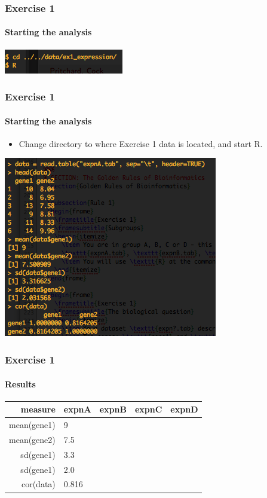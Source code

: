 \documentclass[table]{beamer}
\begin{document}
  \begin{frame}
    \frametitle{Exercise 1}
    \framesubtitle{Starting the analysis}
    \includegraphics[width=.5\textwidth]{images/ex1_screenshot_a}
  \end{frame}

  \begin{frame}
    \frametitle{Exercise 1}
    \framesubtitle{Starting the analysis}
    \begin{itemize}
      \item Change directory to where Exercise 1 data is located, and start R.
    \end{itemize}
    \includegraphics[width=.5\textwidth]{images/ex1_screenshot_b}
  \end{frame}

  \begin{frame}
    \frametitle{Exercise 1}
    \framesubtitle{Results}
    \begin{center}
	\begin{tabular}{r|l|l|l|l}
	  measure & expnA & expnB & expnC & expnD \\
	  \hline
	  mean(gene1) & 9     &  &  & \\
	  mean(gene2) & 7.5   &  &  & \\
  	  sd(gene1)   & 3.3   &  &  & \\
  	  sd(gene1)   & 2.0   &  &  & \\  
	  cor(data)   & 0.816 &  &  & \\  
	\end{tabular}
    \end{center}
  \end{frame}
\end{document}
